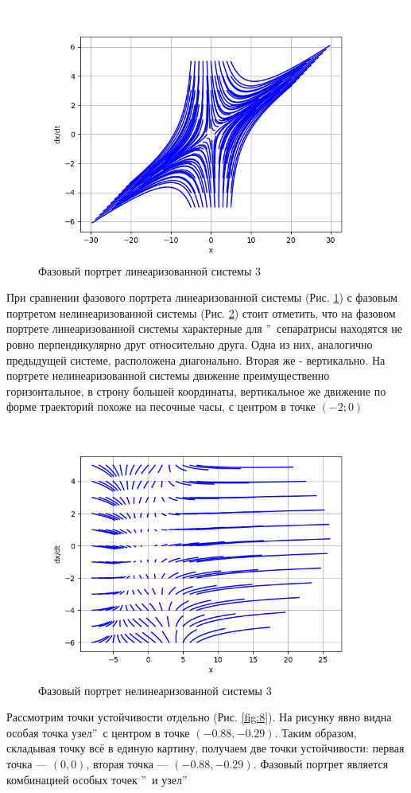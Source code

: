 \begin{figure}[H]
	\centering
	\includegraphics[width=0.6\linewidth]{body/images/Linearized-system-3.png}
	\caption{Фазовый портрет линеаризованной системы 3}
	\label{fig:6}
\end{figure}

При сравнении фазового портрета линеаризованной системы (Рис. \ref{fig:6}) с фазовым портретом нелинеаризованной системы
(Рис. \ref{fig:7}) стоит отметить, что на фазовом портрете линеаризованной системы характерные для \textquotedblright\ сепаратрисы находятся не ровно перпендикулярно друг относительно друга.
Одна из них, аналогично предыдущей системе, расположена диагонально. Вторая же - вертикально.
На портрете нелинеаризованной системы движение преимущественно горизонтальное, в строну большей координаты,
вертикальное же движение по форме траекторий похоже на песочные часы, с центром в точке $(-2;0)$

\begin{figure}[H]
	\centering
	\includegraphics[width=0.6\linewidth]{body/images/System-3.png}
	\caption{Фазовый портрет нелинеаризованной системы 3}
	\label{fig:7}
\end{figure}

Рассмотрим точки устойчивости отдельно (Рис. \ref{fig:8}). На рисунку явно видна особая
точка  узел\textquotedblright\ с центром в точке $(-0.88, -0.29)$. Таким образом,
складывая точку всё в единую картину, получаем две точки устойчивости: первая точка — $(0, 0)$,
вторая точка — $(-0.88, -0.29)$. Фазовый портрет является комбинацией особых точек
\textquotedblright\ и  узел\textquotedblright


